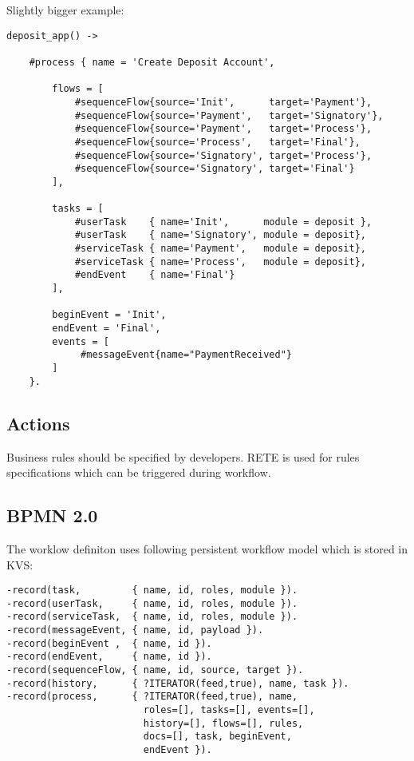 \newpage
Slightly bigger example:

\vspace{1\baselineskip}
\begin{lstlisting}
deposit_app() ->

    #process { name = 'Create Deposit Account',

        flows = [
            #sequenceFlow{source='Init',      target='Payment'},
            #sequenceFlow{source='Payment',   target='Signatory'},
            #sequenceFlow{source='Payment',   target='Process'},
            #sequenceFlow{source='Process',   target='Final'},
            #sequenceFlow{source='Signatory', target='Process'},
            #sequenceFlow{source='Signatory', target='Final'}
        ],

        tasks = [
            #userTask    { name='Init',      module = deposit },
            #userTask    { name='Signatory', module = deposit},
            #serviceTask { name='Payment',   module = deposit},
            #serviceTask { name='Process',   module = deposit},
            #endEvent    { name='Final'}
        ],

        beginEvent = 'Init',
        endEvent = 'Final',
        events = [
             #messageEvent{name="PaymentReceived"}
        ]
    }.
\end{lstlisting}

\subsection{Actions}
Business rules should be specified by developers.
RETE is used for rules specifications which can be triggered during workflow.

\newpage

\subsection{BPMN 2.0}

The worklow definiton uses following persistent workflow model which is stored in KVS:


\vspace{1\baselineskip}
\begin{lstlisting}
-record(task,         { name, id, roles, module }).
-record(userTask,     { name, id, roles, module }).
-record(serviceTask,  { name, id, roles, module }).
-record(messageEvent, { name, id, payload }).
-record(beginEvent ,  { name, id }).
-record(endEvent,     { name, id }).
-record(sequenceFlow, { name, id, source, target }).
-record(history,      { ?ITERATOR(feed,true), name, task }).
-record(process,      { ?ITERATOR(feed,true), name,
                        roles=[], tasks=[], events=[], 
                        history=[], flows=[], rules,
                        docs=[], task, beginEvent, 
                        endEvent }).
\end{lstlisting}

